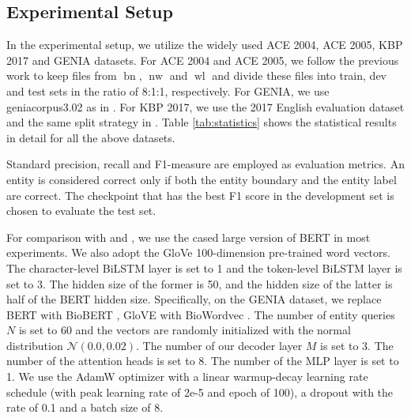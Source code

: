 \documentclass{article}
\begin{document}
\subsection{Experimental Setup}
In the experimental setup, we utilize the widely used ACE 2004, ACE 2005, KBP 2017 and GENIA datasets. For ACE 2004 and ACE 2005, we follow the previous work \cite{katiyar2018nested,lin2019sequence} to keep files from $\operatorname{bn}$, $\operatorname{nw}$ and $\operatorname{wl}$ and divide these files into train, dev and test sets in the ratio of 8:1:1, respectively. For GENIA, we use geniacorpus3.02 as in \citep{katiyar2018nested}. For KBP 2017, we use the 2017 English evaluation dataset and the same split strategy in \citep{lin2019sequence}. Table \ref{tab:statistics} shows the statistical results in detail for all the above datasets.

Standard precision, recall and F1-measure are employed as evaluation metrics. An entity is considered correct only if both the entity boundary and the entity label are correct. The checkpoint that has the best F1 score in the development set is chosen to evaluate the test set.

For comparison with \citep{jue2020pyramid} and \citep{yu2020named}, we use the cased large version of BERT in most experiments. We also adopt the GloVe \cite{pennington-etal-2014-glove} 100-dimension pre-trained word vectors. The character-level BiLSTM layer is set to 1 and the token-level BiLSTM layer is set to 3. The hidden size of the former is 50, and the hidden size of the latter is half of the BERT hidden size. Specifically, on the GENIA dataset, we replace BERT with BioBERT \cite{10.1093/bioinformatics/btz682}, GloVE with BioWordvec \cite{chiu-etal-2016-train}. The number of entity queries $N$ is set to 60 and the vectors are randomly initialized with the normal distribution $\mathcal{N}(0.0, 0.02)$. The number of our decoder layer $M$ is set to 3. The number of the attention heads is set to 8. The number of the MLP layer is set to 1. We use the AdamW \cite{DBLP:journals/corr/abs-1711-05101} optimizer with a linear warmup-decay learning rate schedule (with peak learning rate of 2e-5 and epoch of 100), a dropout with the rate of 0.1 and a batch size of 8.
\end{document}
